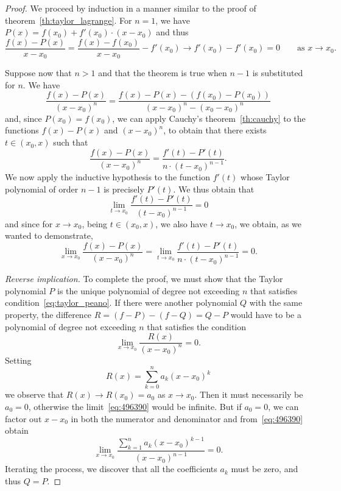 \begin{proof}
\mymark{**}%
%
We proceed by induction in a manner similar to the proof 
of theorem~\ref{th:taylor_lagrange}.
%
For $n=1$, we have $P(x)=f(x_0) + f'(x_0)\cdot (x-x_0)$ and thus 
\[
 \frac{f(x)-P(x)}{x-x_0} = \frac{f(x) - f(x_0)}{x-x_0} - f'(x_0) 
 \to f'(x_0) - f'(x_0) = 0  \qquad\text{as $x\to x_0$.}
\]

Suppose now that $n>1$ and that the theorem is true
when $n-1$ is substituted for $n$. We have 
\[
  \frac{f(x)-P(x)}{(x-x_0)^n} 
  = \frac{f(x)-P(x)-(f(x_0)-P(x_0))}{(x-x_0)^n - (x_0-x_0)^n}
\]
and, since $P(x_0) = f(x_0)$, we can apply Cauchy's theorem~\ref{th:cauchy}
to the functions $f(x)-P(x)$ and $(x-x_0)^n$,
to obtain that there exists $t\in (x_0,x)$ such that
\[
  \frac{f(x)-P(x)}{(x-x_0)^n} = \frac{f'(t)-P'(t)}{n\cdot (t-x_0)^{n-1}}.
\]
We now apply the inductive hypothesis to the function $f'(t)$ whose 
Taylor polynomial of order $n-1$ is precisely $P'(t)$. We thus obtain 
that 
\[
 \lim_{t\to x_0} \frac{f'(t)-P'(t)}{(t-x_0)^{n-1}} = 0 
\]
and since for $x\to x_0$, being $t\in(x_0,x)$, we also have 
$t\to x_0$, we obtain, as we wanted to demonstrate,
\[
 \lim_{x\to x_0} \frac{f(x)-P(x)}{(x-x_0)^n} 
 = \lim_{t\to x_0} \frac{f'(t)-P'(t)}{n\cdot (t-x_0)^{n-1}} = 0. 
\]

\emph{Reverse implication.}
To complete the proof, we must show that the Taylor polynomial $P$ is the unique
polynomial of degree not exceeding $n$ that satisfies
condition~\eqref{eq:taylor_peano}.
If there were another polynomial $Q$ with the same property, the difference 
$R=(f-P)-(f-Q)=Q-P$ would have to be a polynomial of degree 
not exceeding $n$ that satisfies the condition 
\begin{equation}\label{eq:496390}
  \lim_{x\to x_0}\frac{R(x)}{(x-x_0)^n}=0.  
\end{equation}
Setting 
\[
  R(x) = \sum_{k=0}^n a_k (x-x_0)^k  
\]
we observe that $R(x)\to R(x_0) = a_0$ as $x\to x_0$. 
Then it must necessarily be $a_0 = 0$, 
otherwise the limit~\eqref{eq:496390} would be infinite.
But if $a_0=0$, we can factor out $x-x_0$ in both the numerator 
and denominator and from~\eqref{eq:496390} obtain 
\[
  \lim_{x\to x_0}\frac{\displaystyle \sum_{k=1}^n a_k (x-x_0)^{k-1}}{(x-x_0)^{n-1}}=0.  
\]
Iterating the process, we discover that all the coefficients $a_k$ 
must be zero, and thus $Q=P$.
\end{proof}

